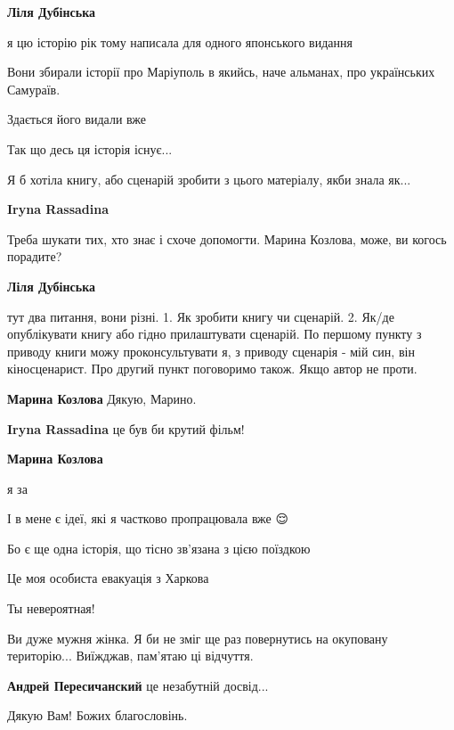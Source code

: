 \begin{itemize} %
\textbf{Ліля Дубінська} 

я цю історію рік тому написала для одного японського видання

Вони збирали історії про Маріуполь в якийсь, наче альманах, про українських
Самураїв.

Здається його видали вже

Так що десь ця історія існує...

Я б хотіла книгу, або сценарій зробити з цього матеріалу, якби знала як...

\textbf{Iryna Rassadina} 

Треба шукати тих, хто знає і схоче допомогти. Марина Козлова, може, ви когось порадите?

\textbf{Ліля Дубінська} 

тут два питання, вони різні. 1. Як зробити книгу чи сценарій. 2. Як/де
опублікувати книгу або гідно прилаштувати сценарій. По першому пункту з приводу
книги можу проконсультувати я, з приводу сценарія - мій син, він кіносценарист.
Про другий пункт поговоримо також. Якщо автор не проти.

\textbf{Марина Козлова} Дякую, Марино.

\textbf{Iryna Rassadina} це був би крутий фільм!

\textbf{Марина Козлова} 

я за

І в мене є ідеї, які я частково пропрацювала вже 😌

Бо є ще одна історія, що тісно зв'язана з цією поїздкою

Це моя особиста евакуація з Харкова
\end{itemize} %


Ты невероятная!


Ви дуже мужня жінка. Я би не зміг ще раз повернутись на окуповану територію... Виїжджав, пам'ятаю ці відчуття.

\begin{itemize} %
\textbf{Андрей Пересичанский} це незабутній досвід...
\end{itemize} %


Дякую Вам! Божих благословінь.


